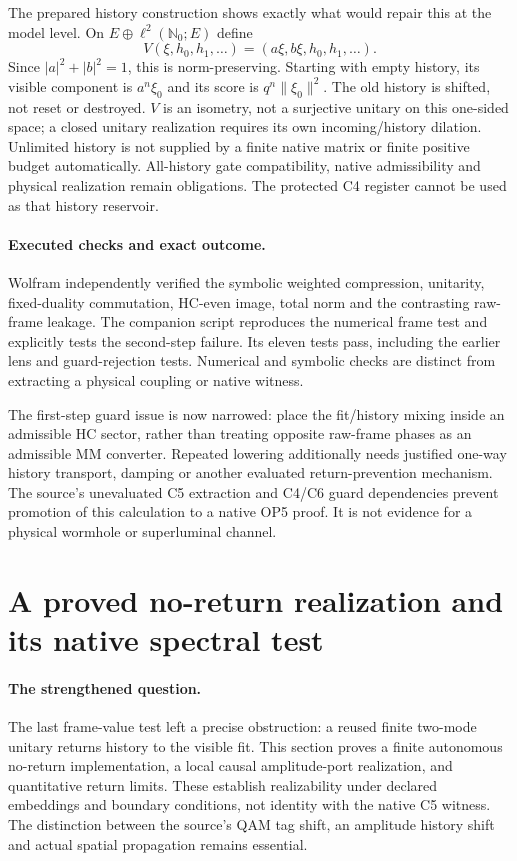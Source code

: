 \documentclass[11pt,a4paper]{article}
\begin{document}
The prepared history construction shows exactly what would repair
this at the model level. On $E\oplus\ell^2(\mathbb N_0;E)$ define
\[
 V(\xi,h_0,h_1,\ldots)=(a\xi,b\xi,h_0,h_1,\ldots).
\]
Since $|a|^2+|b|^2=1$, this is norm-preserving. Starting with
empty history, its visible component is $a^n\xi_0$ and its score
is $q^n\|\xi_0\|^2$. The old history is shifted, not reset or
destroyed. $V$ is an isometry, not a surjective unitary on this
one-sided space; a closed unitary realization requires its own
incoming/history dilation. Unlimited history is not supplied by
a finite native matrix or finite positive budget automatically.
All-history gate compatibility, native admissibility and physical
realization remain obligations. The protected C4 register cannot
be used as that history reservoir.

\paragraph{Executed checks and exact outcome.}
Wolfram independently verified the symbolic weighted compression,
unitarity, fixed-duality commutation, HC-even image, total norm and
the contrasting raw-frame leakage. The companion script reproduces
the numerical frame test and explicitly tests the second-step
failure. Its eleven tests pass, including the earlier lens and
guard-rejection tests. Numerical and symbolic checks are distinct
from extracting a physical coupling or native witness.

The first-step guard issue is now narrowed: place the fit/history
mixing inside an admissible HC sector, rather than treating opposite
raw-frame phases as an admissible MM converter. Repeated lowering
additionally needs justified one-way history transport, damping or
another evaluated return-prevention mechanism. The source's
unevaluated C5 extraction and C4/C6 guard dependencies prevent
promotion of this calculation to a native OP5 proof. It is not
evidence for a physical wormhole or superluminal channel.

\section{A proved no-return realization and its native spectral test}
\label{sec:proved-no-return-realization}

\paragraph{The strengthened question.}
The last frame-value test left a precise obstruction: a reused
finite two-mode unitary returns history to the visible fit. This
section proves a finite autonomous no-return implementation, a
local causal amplitude-port realization, and quantitative return
limits. These establish realizability under declared embeddings
and boundary conditions, not identity with the native C5 witness.
The distinction between the source's QAM tag shift, an amplitude
history shift and actual spatial propagation remains essential.
\end{document}

